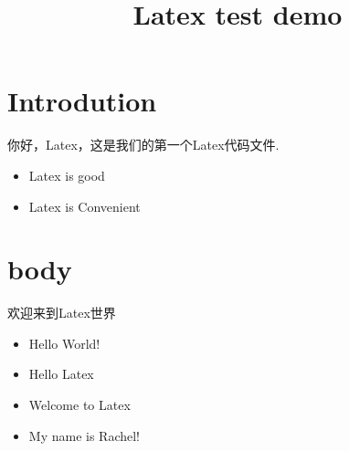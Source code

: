 \documentclass[11pt,a4paper]{article}
\title{Latex test demo}
\begin{document}
\maketitle
\section{Introdution}
\textcolor[rgb]{1,0,0}{你好，Latex，这是我们的第一个Latex代码文件.}
    \begin{itemize}
        \item Latex is good
        \item Latex is Convenient
    \end{itemize}

\section{body}
\textcolor[rgb]{1,0,1}{欢迎来到Latex世界}
    \begin{itemize}
        \item Hello World!
        \item Hello Latex
        \item Welcome to Latex
        \item My name is Rachel!
    \end{itemize}
\end{document}
